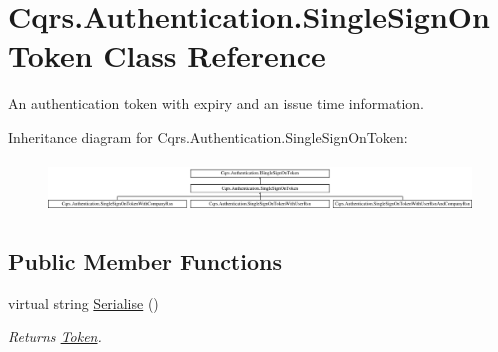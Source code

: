 \hypertarget{classCqrs_1_1Authentication_1_1SingleSignOnToken}{}\section{Cqrs.\+Authentication.\+Single\+Sign\+On\+Token Class Reference}
\label{classCqrs_1_1Authentication_1_1SingleSignOnToken}


An authentication token with expiry and an issue time information.  


Inheritance diagram for Cqrs.\+Authentication.\+Single\+Sign\+On\+Token\+:\begin{figure}[H]
\begin{center}
\leavevmode
\includegraphics[height=1.355932cm]{classCqrs_1_1Authentication_1_1SingleSignOnToken}
\end{center}
\end{figure}
\subsection*{Public Member Functions}
\begin{DoxyCompactItemize}
\item 
virtual string \hyperlink{classCqrs_1_1Authentication_1_1SingleSignOnToken_a5e859c6c5db5aaa9ef4e8f2086df4604_a5e859c6c5db5aaa9ef4e8f2086df4604}{Serialise} ()
\begin{DoxyCompactList}\small\item\em Returns \hyperlink{classCqrs_1_1Authentication_1_1SingleSignOnToken_a7a704dd5d4f396e5c0b413b4b39e7406_a7a704dd5d4f396e5c0b413b4b39e7406}{Token}. \end{DoxyCompactList}\end{DoxyCompactItemize}
